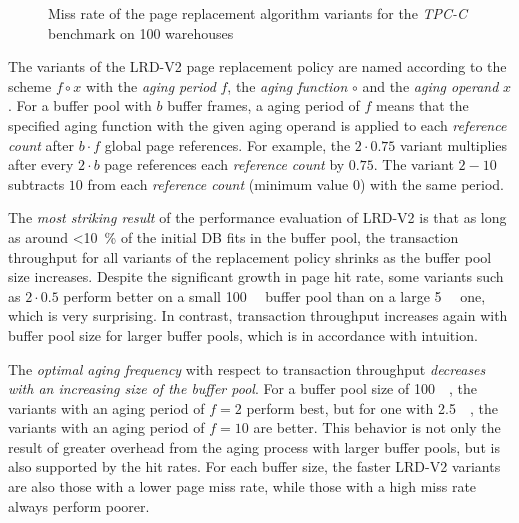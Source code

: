 \begin{@empty}
\begin{figure}[h!]
        \vspace{.5em}
        \caption[Miss rate of LRD-V2 variants]{Miss rate of the  page replacement algorithm variants for the \textit{TPC-C} benchmark on 100 warehouses}
        \label{fig:lrdv2hitrate}
    \end{figure}
\end{@empty}

    The variants of the LRD-V2 page replacement policy are named according to the scheme $f \circ x$ with the \emph{aging period} $f$, the \emph{aging function} $\circ$ and the \emph{aging operand} $x$. For a buffer pool with $b$ buffer frames, a aging period of $f$ means that the specified aging function with the given aging operand is applied to each \textit{reference count} after $b \cdot f$ global page references. For example, the $2 \cdot 0.75$ variant multiplies after every $2 \cdot b$ page references each \textit{reference count} by $0.75$. The variant $2 - 10$ subtracts $10$ from each \textit{reference count} (minimum value $0$) with the same period.

    The \emph{most striking result} of the performance evaluation of LRD-V2 is that as long as around \SI{<10}{\percent} of the initial DB fits in the buffer pool, the transaction throughput for all variants of the replacement policy shrinks as the buffer pool size increases. Despite the significant growth in page hit rate, some variants such as $2 \cdot 0.5$ perform better on a small \SI{100}{\mega\byte} buffer pool than on a large \SI{5}{\giga\byte} one, which is very surprising. In contrast, transaction throughput increases again with buffer pool size for larger buffer pools, which is in accordance with intuition.

    The \emph{optimal aging frequency} with respect to transaction throughput \emph{decreases with an increasing size of the buffer pool}. For a buffer pool size of \SI{100}{\mega\byte}, the variants with an aging period of $f = 2$ perform best, but for one with \SI{2.5}{\giga\byte}, the variants with an aging period of $f = 10$ are better. This behavior is not only the result of greater overhead from the aging process with larger buffer pools, but is also supported by the hit rates. For each buffer size, the faster LRD-V2 variants are also those with a lower page miss rate, while those with a high miss rate always perform poorer.

